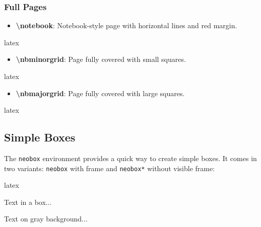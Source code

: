 \documentclass[
    margin=2cm
]{neoschool}
\begin{document}
\subsubsection{Full Pages}

\begin{itemize}
\item
  \textbf{\textbackslash notebook}: Notebook-style page with horizontal lines and red
  margin.
\end{itemize}

\begin{code}{latex}
\notebook  %
\end{code}

\begin{itemize}
\item
  \textbf{\textbackslash nbminorgrid}: Page fully covered with small squares.
\end{itemize}

\begin{code}{latex}
\nbminorgrid  %
\end{code}

\begin{itemize}
\item
  \textbf{\textbackslash nbmajorgrid}: Page fully covered with large squares.
\end{itemize}

\begin{code}{latex}
\nbmajorgrid  %
\end{code}

\subsection{Simple Boxes}

The \texttt{neobox} environment provides a quick way to create simple boxes. It comes in two variants: \texttt{neobox} with frame and \texttt{neobox*} without visible frame:

\begin{code}{latex}
\begin{neobox}[colframe=blue,colback=blue!5]
    Text in a box...
\end{neobox}

\begin{neobox*}[colback=gray!10]
    Text on gray background...
\end{neobox*}
\end{code}
\end{document}
